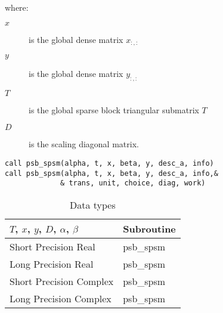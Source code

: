 where:
\begin{description}
\item[$x$] is the global dense matrix $x_{:, :}$
\item[$y$] is the global dense matrix $y_{:, :}$
\item[$T$] is the global sparse block triangular submatrix $T$
\item[$D$] is the scaling diagonal matrix.
\end{description}

\begin{verbatim}
call psb_spsm(alpha, t, x, beta, y, desc_a, info)
call psb_spsm(alpha, t, x, beta, y, desc_a, info,&
             & trans, unit, choice, diag, work)
\end{verbatim} 

\begin{table}[h]
\begin{center}
\begin{tabular}{ll}
\hline
$T$, $x$, $y$, $D$, $\alpha$, $\beta$ & {\bf Subroutine}\\
\hline
Short Precision Real & psb\_spsm \\
Long Precision Real & psb\_spsm \\
Short Precision Complex & psb\_spsm \\
Long Precision Complex & psb\_spsm \\
\hline
\end{tabular}
\end{center}
\caption{Data types\label{tab:f90spsm}}
\end{table}



